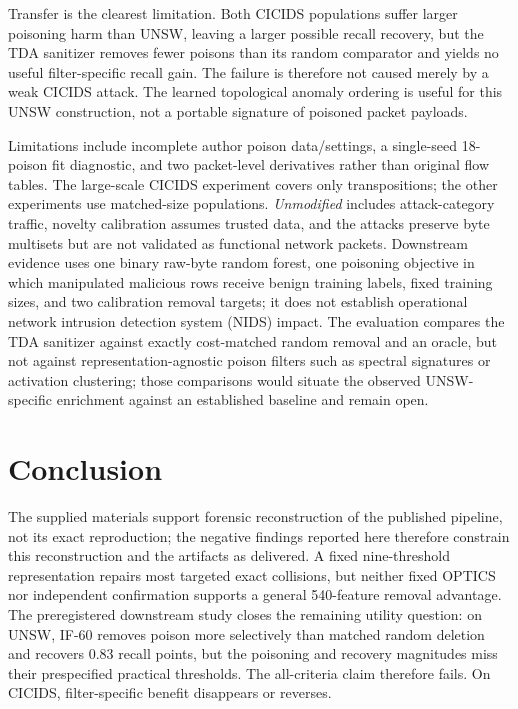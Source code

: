 \documentclass[conference]{IEEEtran}
\begin{document}
Transfer is the clearest limitation. Both CICIDS populations suffer larger
poisoning harm than UNSW, leaving a larger possible recall recovery, but the TDA sanitizer removes
fewer poisons than its random comparator and yields no useful filter-specific
recall gain. The failure is therefore not caused merely by a weak CICIDS attack.
The learned topological anomaly ordering is useful for this UNSW construction,
not a portable signature of poisoned packet payloads.

Limitations include incomplete author poison data/settings, a single-seed
18-poison fit diagnostic, and two packet-level derivatives rather than original
flow tables. The large-scale CICIDS experiment covers only transpositions; the
other experiments use matched-size populations. \emph{Unmodified} includes attack-category traffic, novelty
calibration assumes trusted data, and the attacks preserve byte multisets but
are not validated as functional network packets. Downstream evidence uses one
binary raw-byte random forest, one poisoning objective in which manipulated
malicious rows receive benign training labels, fixed training sizes, and two
calibration removal targets; it does not establish operational network
intrusion detection system (NIDS) impact.
The evaluation compares the TDA sanitizer against exactly cost-matched random
removal and an oracle, but not against representation-agnostic poison filters
such as spectral signatures or activation clustering; those comparisons would
situate the observed UNSW-specific enrichment against an established baseline
and remain open.

\section{Conclusion}
The supplied materials support forensic reconstruction of the published
pipeline, not its exact reproduction; the negative findings reported here
therefore constrain this reconstruction and the artifacts as delivered.
A fixed nine-threshold representation repairs most targeted exact collisions,
but neither fixed OPTICS nor independent confirmation supports a general
540-feature removal advantage. The preregistered downstream study closes the
remaining utility question: on UNSW, IF-60 removes poison more selectively than
matched random deletion and recovers 0.83 recall points, but the poisoning and
recovery magnitudes miss their prespecified practical thresholds. The
all-criteria claim
therefore fails. On CICIDS, filter-specific benefit disappears or reverses.
\end{document}
